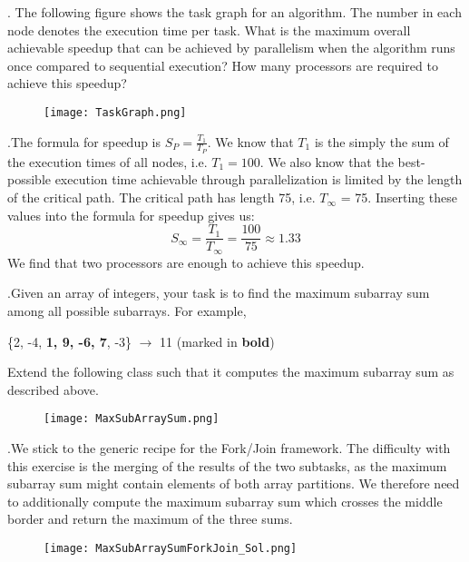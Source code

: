 \documentclass[main.tex]{subfiles}
\begin{document}
\begin{ExerciseList}
    \Exercise[title={Task Graph}, label=TG]. \quad The following figure shows the task graph for an algorithm. The number in each node denotes the execution time per task. What is the maximum overall achievable speedup that can be achieved by parallelism when the algorithm runs once compared to sequential execution? How many processors are required to achieve this speedup?
        \begin{figure}[h]
            \centering
            \texttt{[image: TaskGraph.png]}
        \end{figure}
    \Answer[ref={TG}].\quad The formula for speedup is $S_P = \frac{T_1}{T_P}$. We know that $T_1$ is the simply the sum of the execution times of all nodes, i.e. $T_1 = 100$. We also know that the best-possible execution time achievable through parallelization is limited by the length of the critical path. The critical path has length 75, i.e. $T_\infty$ = 75. Inserting these values into the formula for speedup gives us:
        \begin{equation*}
            S_\infty = \frac{T_1}{T_\infty} = \frac{100}{75} \approx 1.33
        \end{equation*}
        We find that two processors are enough to achieve this speedup.
        \pagebreak
        
    \Exercise[title={Fork/Join Framework},label=FJW].\quad Given an array of integers, your task is to find the maximum subarray sum among all possible subarrays. For example,
    \begin{center}
        \{2, -4, \textbf{1, 9, -6, 7}, -3\} $\rightarrow$ 11 (marked in \textbf{bold})
    \end{center}
    Extend the following class such that it computes the maximum subarray sum as described above.
    \begin{figure}[H]
        \centering
        \texttt{[image: MaxSubArraySum.png]}
    \end{figure}
    \pagebreak
    \Answer[ref={FJW}].\quad We stick to the generic recipe for the Fork/Join framework. The difficulty with this exercise is the merging of the results of the two subtasks, as the maximum subarray sum might contain elements of both array partitions. We therefore need to additionally compute the maximum subarray sum which crosses the middle border and return the maximum of the three sums.
        \begin{figure}[H]
            \centering
            \texttt{[image: MaxSubArraySumForkJoin\_Sol.png]}
        \end{figure}
    

\end{ExerciseList}
\end{document}
